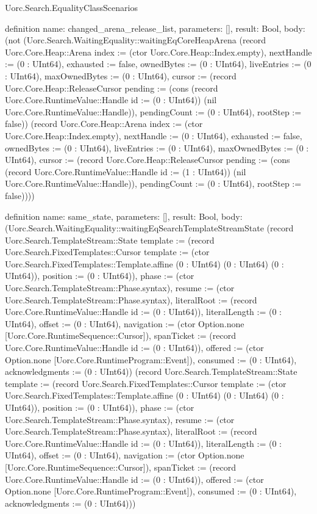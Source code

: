 \begin{lexlean}{Uorc.Search.EqualityClassScenarios}
\begin{semanticmodule}
definition{
  name: changed_arena_release_list,
  parameters: [],
  result: Bool,
  body: (not (Uorc.Search.WaitingEquality::waitingEqCoreHeapArena (record Uorc.Core.Heap::Arena {index := (ctor Uorc.Core.Heap::Index.empty), nextHandle := (0 : UInt64), exhausted := false, ownedBytes := (0 : UInt64), liveEntries := (0 : UInt64), maxOwnedBytes := (0 : UInt64), cursor := (record Uorc.Core.Heap::ReleaseCursor {pending := (cons (record Uorc.Core.RuntimeValue::Handle {id := (0 : UInt64)}) (nil Uorc.Core.RuntimeValue::Handle)), pendingCount := (0 : UInt64), rootStep := false})}) (record Uorc.Core.Heap::Arena {index := (ctor Uorc.Core.Heap::Index.empty), nextHandle := (0 : UInt64), exhausted := false, ownedBytes := (0 : UInt64), liveEntries := (0 : UInt64), maxOwnedBytes := (0 : UInt64), cursor := (record Uorc.Core.Heap::ReleaseCursor {pending := (cons (record Uorc.Core.RuntimeValue::Handle {id := (1 : UInt64)}) (nil Uorc.Core.RuntimeValue::Handle)), pendingCount := (0 : UInt64), rootStep := false})})))
}

definition{
  name: same_state,
  parameters: [],
  result: Bool,
  body: (Uorc.Search.WaitingEquality::waitingEqSearchTemplateStreamState (record Uorc.Search.TemplateStream::State {template := (record Uorc.Search.FixedTemplates::Cursor {template := (ctor Uorc.Search.FixedTemplates::Template.affine (0 : UInt64) (0 : UInt64) (0 : UInt64)), position := (0 : UInt64)}), phase := (ctor Uorc.Search.TemplateStream::Phase.syntax), resume := (ctor Uorc.Search.TemplateStream::Phase.syntax), literalRoot := (record Uorc.Core.RuntimeValue::Handle {id := (0 : UInt64)}), literalLength := (0 : UInt64), offset := (0 : UInt64), navigation := (ctor Option.none [Uorc.Core.RuntimeSequence::Cursor]), spanTicket := (record Uorc.Core.RuntimeValue::Handle {id := (0 : UInt64)}), offered := (ctor Option.none [Uorc.Core.RuntimeProgram::Event]), consumed := (0 : UInt64), acknowledgments := (0 : UInt64)}) (record Uorc.Search.TemplateStream::State {template := (record Uorc.Search.FixedTemplates::Cursor {template := (ctor Uorc.Search.FixedTemplates::Template.affine (0 : UInt64) (0 : UInt64) (0 : UInt64)), position := (0 : UInt64)}), phase := (ctor Uorc.Search.TemplateStream::Phase.syntax), resume := (ctor Uorc.Search.TemplateStream::Phase.syntax), literalRoot := (record Uorc.Core.RuntimeValue::Handle {id := (0 : UInt64)}), literalLength := (0 : UInt64), offset := (0 : UInt64), navigation := (ctor Option.none [Uorc.Core.RuntimeSequence::Cursor]), spanTicket := (record Uorc.Core.RuntimeValue::Handle {id := (0 : UInt64)}), offered := (ctor Option.none [Uorc.Core.RuntimeProgram::Event]), consumed := (0 : UInt64), acknowledgments := (0 : UInt64)}))
}


\end{semanticmodule}
\end{lexlean}
